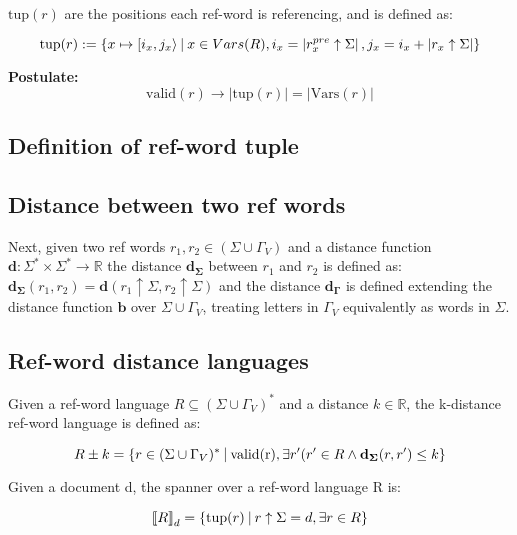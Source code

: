 \documentclass{article}
\newcommand{\abs}[1]{\left|#1\right|}
\newcommand{\set}[1]{\left\{#1\right\}}
\newcommand{\st}{\ \vline \ }
\newcommand{\dbrack}[1]{\left\llbracket#1\right\rrbracket}
\begin{document}
$\mathrm{tup}(r)$ are the positions each ref-word is referencing,
and is defined as:

\begin{equation}
    \mathrm{tup}(r) := \set{x \mapsto [i_x, j_x\rangle \st x \in
    Vars(R), i_x = \abs{r_x^{pre} \uparrow \Sigma}, j_x = i_x +
    \abs{r_x \uparrow \Sigma}}
\end{equation}

\textbf{Postulate:} 
\begin{equation}
    \mathrm{valid}(r) \rightarrow \abs{\mathrm{tup}(r)} = \abs{\mathrm{Vars}(r)}
\end{equation}
\subsection*{Definition of ref-word tuple}

\subsection*{Distance between two ref words}


Next, given two ref words $r_1, r_2 \in (\Sigma \cup \Gamma_V)$ and
a distance function 
$\mathbf{d} : \Sigma^* \times \Sigma^* \rightarrow \mathbb{R}$
the distance $\mathbf{d_\Sigma}$ between $r_1$ and $r_2$
is defined as: $\mathbf{d_\Sigma}(r_1, r_2) = \mathbf{d}(r_1 \uparrow
\Sigma, r_2 \uparrow \Sigma)$ and the distance $\mathbf{d_{\Gamma}}$ is defined extending the distance function $\mathbf{b}$ over $\Sigma\cup \Gamma_V$, treating letters in $\Gamma_V$ equivalently as words in $\Sigma$. 

\subsection*{Ref-word distance languages}

Given a ref-word language $R \subseteq (\Sigma\cup\Gamma_V)^*$ and
a distance $k \in \mathbb{R}$, the k-distance ref-word language is
defined as:

\begin{equation}
    R \pm k = \set{r \in (\Sigma \cup \Gamma_V)^* \st  \mathrm{valid(r)},
    \exists r' (r'\in R \land \mathbf{d_\Sigma}(r, r') \leq k }
\end{equation}

Given a document d, the spanner over a ref-word language R is:

\begin{equation}
    \dbrack{R}_d = \set{\mathrm{tup}(r) \st r\uparrow \Sigma = d,
    \exists r \in R}
\end{equation}
\end{document}
